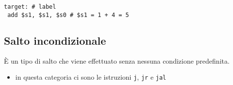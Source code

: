 \documentclass[../main.tex]{subfiles}
\begin{document}
\texttt{target: \hspace*{0cm} \hspace*{0cm} \hspace*{0cm} \hspace*{0cm} \hspace*{0cm} \hspace*{0cm} \hspace*{0cm} \hspace*{0cm} \hspace*{0cm} \hspace*{0cm} \hspace*{0cm} \hspace*{0cm} \hspace*{0cm} \# label} \\
\texttt{\hspace*{0cm} \hspace*{0cm} add \$s1, \$s1, \$s0 \hspace*{0cm} \hspace*{0cm} \# \$s1 = 1 + 4 = 5} \\

\newpage

\subsection{Salto incondizionale}
È un tipo di salto che viene effettuato senza nessuna condizione predefinita.
\begin{itemize}
    \item in questa categoria ci sono le istruzioni
    \texttt{j}, \texttt{jr} e \texttt{jal}
\end{itemize}

\vspace*{-4mm}
\end{document}
